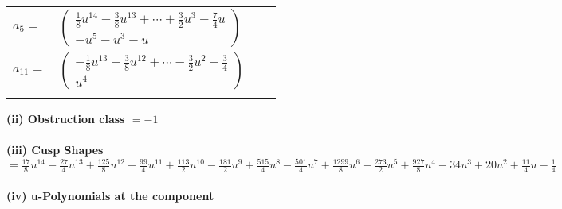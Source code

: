 \documentclass[1p]{elsarticle_modified}
\theoremstyle{definition}
\begin{document}
\begin{tabular}{m{7pt} m{180pt} m{7pt} m{180pt} }
\flushright $a_{5}=$&$\begin{pmatrix}\frac{1}{8} u^{14}-\frac{3}{8} u^{13}+\cdots+\frac{3}{2} u^3-\frac{7}{4} u\\- u^5- u^3- u\end{pmatrix}$ \\
\flushright $a_{11}=$&$\begin{pmatrix}-\frac{1}{8} u^{13}+\frac{3}{8} u^{12}+\cdots-\frac{3}{2} u^2+\frac{3}{4}\\u^4\end{pmatrix}$\\&\end{tabular}
\flushleft \textbf{(ii) Obstruction class $= -1$}\\~\\
\flushleft \textbf{(iii) Cusp Shapes $= \frac{17}{8} u^{14}-\frac{27}{4} u^{13}+\frac{125}{8} u^{12}-\frac{99}{4} u^{11}+\frac{113}{2} u^{10}-\frac{181}{2} u^9+\frac{515}{4} u^8-\frac{501}{4} u^7+\frac{1299}{8} u^6-\frac{273}{2} u^5+\frac{927}{8} u^4-34 u^3+20 u^2+\frac{11}{4} u-\frac{1}{4}$}\\~\\
\newpage\renewcommand{\arraystretch}{1}
\flushleft \textbf{(iv) u-Polynomials at the component}\newline \\
\end{document}
